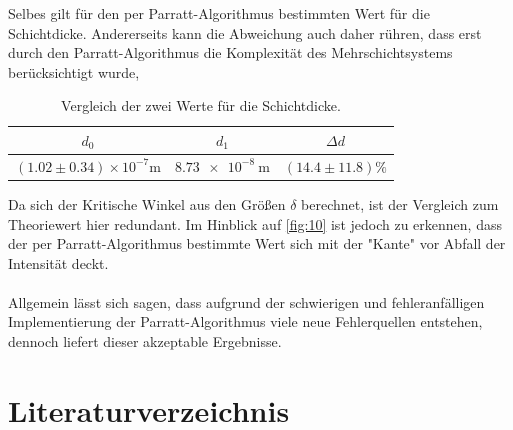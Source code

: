 \documentclass[12pt]{article}
\begin{document}
Selbes gilt für den per Parratt-Algorithmus bestimmten Wert für die Schichtdicke. Andererseits kann die Abweichung auch daher rühren, dass erst durch den Parratt-Algorithmus die Komplexität des Mehrschichtsystems berücksichtigt wurde, 
\begin{table}[H]
  \centering
  \renewcommand{\arraystretch}{1.5}
  \caption{Vergleich der zwei Werte für die Schichtdicke.}
  \begin{tabular}{c|c|c}
    \hline
    $d_0$ & $d_1$ & $\Delta d$ \\
    \hline
    $(1.02\pm0.34)\times 10^{-7}\si{\meter}$ & $\SI{8.73e-8}{\meter}$ & $(\num{14.4}\pm\num{11.8})\%$  \\
  \end{tabular}
  \label{tab:schichtdicke}
\end{table}
Da sich der Kritische Winkel aus den Größen $\delta$ berechnet, ist der Vergleich zum Theoriewert hier redundant.
Im Hinblick auf \autoref{fig:10} ist jedoch zu erkennen, dass der per Parratt-Algorithmus bestimmte Wert sich mit der "Kante" vor Abfall der Intensität deckt.
\\\\
Allgemein lässt sich sagen, dass aufgrund der schwierigen und fehleranfälligen Implementierung der Parratt-Algorithmus viele neue Fehlerquellen entstehen, dennoch liefert dieser akzeptable Ergebnisse.

\section{Literaturverzeichnis}\label{sec:literaturverzeichnis}
\printbibliography[heading = none]
\newpage
\end{document}

